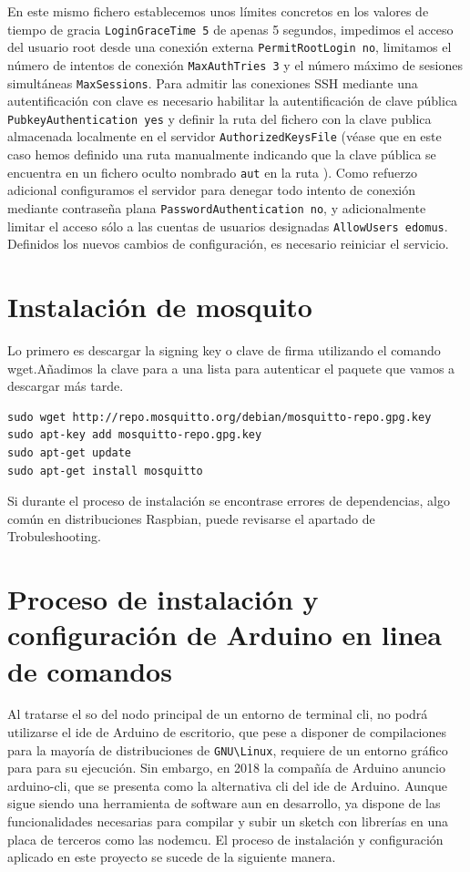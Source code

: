 \vspace{1cm}

En este mismo fichero establecemos unos límites concretos en los valores de tiempo de gracia \verb|LoginGraceTime 5| de apenas 5 segundos, impedimos el acceso del usuario root desde una conexión externa \verb|PermitRootLogin no|, limitamos el número de intentos de conexión \verb|MaxAuthTries 3| y el número máximo de sesiones simultáneas \verb|MaxSessions|. Para admitir las conexiones SSH mediante una autentificación con clave es necesario habilitar la autentificación de clave pública \verb|PubkeyAuthentication yes| y definir la ruta del fichero con la clave publica almacenada localmente en el servidor \verb|AuthorizedKeysFile|  (véase que en este caso hemos definido una ruta manualmente indicando que la clave pública se encuentra en un fichero oculto nombrado \verb|aut| en la ruta ). Como refuerzo adicional configuramos el servidor para denegar todo intento de conexión mediante contraseña plana \verb|PasswordAuthentication no|, y adicionalmente limitar el acceso sólo a las cuentas de usuarios designadas \verb|AllowUsers edomus|. Definidos los nuevos cambios de configuración, es necesario reiniciar el servicio.


\label{AppendiA:Key3}
\section{Instalación de mosquito}
Lo primero es descargar la signing key o clave de firma utilizando el comando wget.Añadimos la clave para a una lista para autenticar el paquete que vamos a descargar más tarde.

\begin{verbatim}
sudo wget http://repo.mosquitto.org/debian/mosquitto-repo.gpg.key
sudo apt-key add mosquitto-repo.gpg.key
sudo apt-get update 
sudo apt-get install mosquitto
\end{verbatim}

Si durante el proceso de instalación se encontrase errores de dependencias, algo común en distribuciones Raspbian, puede revisarse el apartado de Trobuleshooting.


\section{Proceso de instalación y configuración de Arduino en linea de comandos}
\label{AppendiA:Key4}

Al tratarse el \gls{so} del nodo principal de un entorno de terminal \gls{cli}, no podrá utilizarse el \gls{ide} de Arduino de escritorio, que pese a disponer de compilaciones para la mayoría de distribuciones de \verb|GNU\Linux|, requiere de un entorno gráfico para  para su ejecución. Sin embargo, en 2018 la compañía de Arduino anuncio arduino-cli, que se presenta como la alternativa \gls{cli} del \gls{ide} de Arduino. Aunque sigue siendo una herramienta de software aun en desarrollo, ya dispone de las funcionalidades necesarias para compilar y subir un \gls{sketch} con librerías en una placa de terceros como las nodemcu. El proceso de instalación y configuración aplicado en este proyecto se sucede de la siguiente manera.

